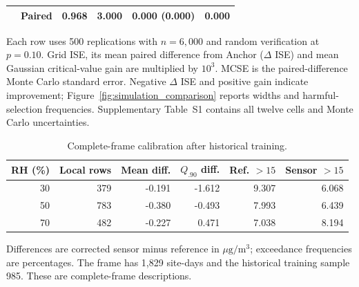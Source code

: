 \begin{table}[p]
\begin{tabular}{llrrrr}
 & Paired & 0.968 & 3.000 & 0.000 (0.000) & 0.000 \\
\bottomrule\end{tabular}
\par\raggedright\noindent Each row uses 500 replications with $n=6,000$ and random verification at $p=0.10$. Grid ISE, its mean paired difference from Anchor ($\Delta$ ISE) and mean Gaussian critical-value gain are multiplied by $10^3$. MCSE is the paired-difference Monte Carlo standard error. Negative $\Delta$ ISE and positive gain indicate improvement; Figure~\ref{fig:simulation_comparison} reports widths and harmful-selection frequencies. Supplementary Table~S1 contains all twelve cells and Monte Carlo uncertainties.
\end{table}
\begin{table}[p]\centering{}
\caption{Complete-frame calibration after historical training.}\label{tab:epa_science}
\setlength{\tabcolsep}{4pt}
\begin{tabular}{rrrrrr}\toprule
RH (\%) & Local rows & Mean diff. & $Q_{.90}$ diff. & Ref. $>15$ & Sensor $>15$ \\\midrule
30 & 379 & -0.191 & -1.612 & 9.307 & 6.068 \\
50 & 783 & -0.380 & -0.493 & 7.993 & 6.439 \\
70 & 482 & -0.227 & 0.471 & 7.038 & 8.194 \\
\bottomrule\end{tabular}
\par\raggedright\noindent Differences are corrected sensor minus reference in $\mu\mathrm{g}/\mathrm{m}^3$; exceedance frequencies are percentages. The frame has 1,829 site-days and the historical training sample 985. These are complete-frame descriptions.
\end{table}
